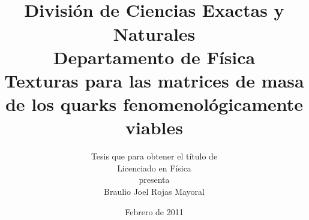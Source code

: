 \documentclass[oneside,12pt]{book}
\title{\vspace{-2cm}{\LARGE {\bf Universidad de Sonora}}\\ 
{\large Divisi\'on de Ciencias Exactas y Naturales\\ Departamento de F\'isica}\\
\vspace{4cm}
Texturas para las matrices de masa de los quarks fenomenol\'ogicamente
viables\\ \vspace{3cm}}
\author{{\small Tesis que para obtener el t\'itulo de}\\ 
{\small Licenciado en F\'isica}\\{\small presenta}\\
Braulio Joel Rojas Mayoral\vspace{3cm}}
\date{{\small Febrero de 2011}}
\begin{document}
\maketitle
{}
\tableofcontents
\renewcommand\tablename{Tabla}
\listoftables

{\normalsize

\newpage}

{\normalsize

\newpage}

{\normalsize

\newpage}




{\normalsize

\newpage}

{\normalsize

\newpage}

{\normalsize

\newpage}

{\normalsize

\newpage}

\appendix
{\normalsize

\newpage}

{\normalsize

\newpage}

\begin{thebibliography}{XXX}
\linespread{1.0}
{\normalsize 

\newpage}
\end{thebibliography}
\end{document}
